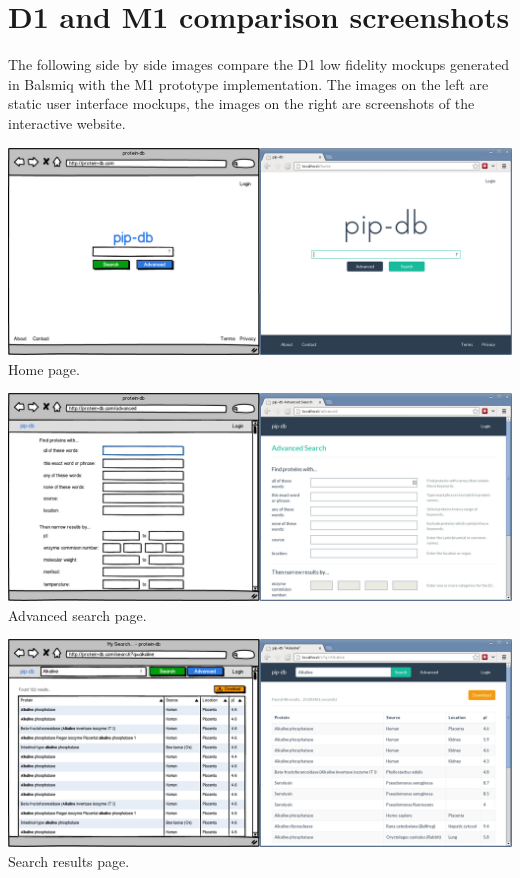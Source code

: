 \chapter{D1 and M1 comparison screenshots}\label{app:d1-m1-comparison}

The following side by side images compare the D1 low fidelity mockups
generated in Balsmiq with the M1 prototype implementation. The images
on the left are static user interface mockups, the images on the right
are screenshots of the interactive website.\\

\begin{center}

\noindent\includegraphics[width=\textwidth]{assets/m1-comparison-homepage}
Home page.

\br{}

\noindent\includegraphics[width=\textwidth]{assets/m1-comparison-advanced}
Advanced search page.

\br{}

\noindent\includegraphics[width=\textwidth]{assets/m1-comparison-results}
Search results page.


\end{center}
